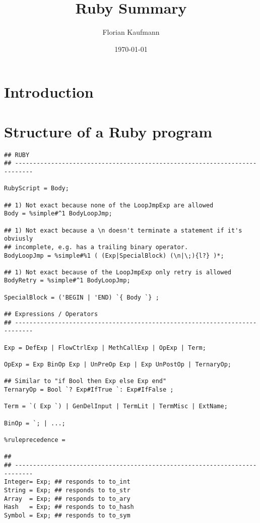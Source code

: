 \documentclass{article}
\begin{document}
\author{Florian Kaufmann}
\title{Ruby Summary}
\date{\today}
\maketitle
\tableofcontents

\section{Introduction}

\section{Structure of a Ruby program}

\begin{verbatim}
## RUBY
## ---------------------------------------------------------------------------
        
RubyScript = Body;       

## 1) Not exact because none of the LoopJmpExp are allowed
Body = %simple#^1 BodyLoopJmp;

## 1) Not exact because a \n doesn't terminate a statement if it's obviusly
## incomplete, e.g. has a trailing binary operator.
BodyLoopJmp = %simple#%1 ( (Exp|SpecialBlock) (\n|\;){l?} )*;     

## 1) Not exact because of the LoopJmpExp only retry is allowed
BodyRetry = %simple#^1 BodyLoopJmp;     
            
SpecialBlock = ('BEGIN | 'END) `{ Body `} ;
              
## Expressions / Operators
## ---------------------------------------------------------------------------
              
Exp = DefExp | FlowCtrlExp | MethCallExp | OpExp | Term;

OpExp = Exp BinOp Exp | UnPreOp Exp | Exp UnPostOp | TernaryOp;
  
## Similar to "if Bool then Exp else Exp end"
TernaryOp = Bool `? Exp#IfTrue `: Exp#IfFalse ;
  
Term = `( Exp `) | GenDelInput | TermLit | TermMisc | ExtName;
              
BinOp = `; | ...;
              
%ruleprecedence =               
              
## 
## ---------------------------------------------------------------------------
Integer= Exp; ## responds to to_int
String = Exp; ## responds to to_str
Array  = Exp; ## responds to to_ary
Hash   = Exp; ## responds to to_hash
Symbol = Exp; ## responds to to_sym
       

\end{verbatim}
\end{document}
